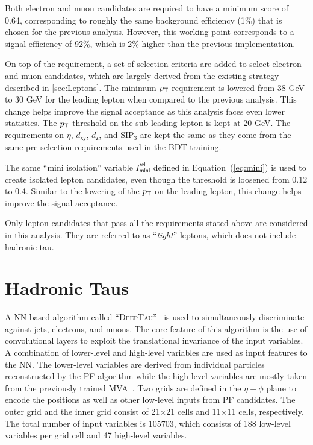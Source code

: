 Both electron and muon candidates are required to have a minimum \TOP score of 0.64, corresponding to roughly the same background efficiency (1\%) that is chosen for the previous analysis. However, this working point corresponds to a signal efficiency of 92\%, which is 2\% higher than the previous implementation.

On top of the \TOP requirement, a set of selection criteria are added to select electron and muon candidates, which are largely derived from the existing strategy described in \autoref{sec:Leptons}. The minimum $p_{\textsf{T}}$ requirement is lowered from 38 GeV to 30 GeV for the leading lepton when compared to the previous analysis. This change helps improve the signal acceptance as this analysis faces even lower statistics. The $p_{\textsf{T}}$ threshold on the sub-leading lepton is kept at 20 GeV. The requirements on $\eta$, $d_{\textsf{xy}}$, $d_{\textsf{z}}$, and SIP$_3$ are kept the same as they come from the same pre-selection requirements used in the \ac{BDT} training. 

The same ``mini isolation'' variable $I^{\textsf{rel}}_{\textsf{mini}}$ defined in Equation~(\ref{eq:mini}) is used to create isolated lepton candidates, even though the threshold is loosened from 0.12 to 0.4. Similar to the lowering of the $p_{\textsf{T}}$ on the leading lepton, this change helps improve the signal acceptance.

Only lepton candidates that pass all the requirements stated above are considered in this analysis. They are referred to as ``\emph{tight}'' leptons, which does not include hadronic tau.

\section{Hadronic Taus}
\label{sec:Taus}

A \ac{NN}-based algorithm called ``\textsc{DeepTau}''~\cite{CMS:2022prd} is used to simultaneously discriminate
against jets, electrons, and muons. The core feature of this algorithm is the use of convolutional layers to exploit the translational invariance of the input variables. A combination of lower-level and high-level variables are used as input features to the \ac{NN}. The lower-level variables are derived from individual particles reconstructed by the \ac{PF} algorithm while the high-level variables are mostly taken from the previously trained \ac{MVA}~\cite{CMS:2015pac}. Two grids are defined in the $\eta-\phi$ plane to encode the positions as well as other low-level inputs from \ac{PF} candidates. The outer grid and the inner grid consist of 21$\times$21 cells and 11$\times$11 cells, respectively. The total number of input variables is 105703, which consists of 188 low-level variables per grid cell and 47 high-level variables.

